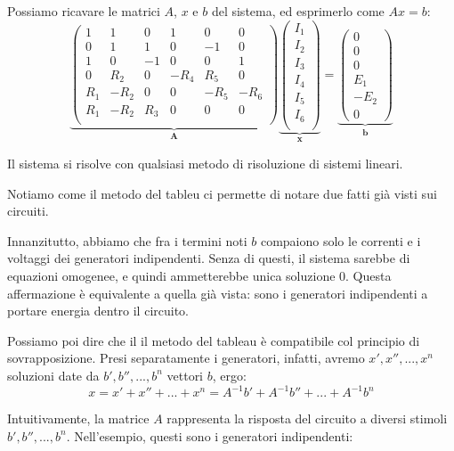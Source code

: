 \documentclass[a4paper,11pt]{article}
\begin{document}
Possiamo ricavare le matrici $A$, $x$ e $b$ del sistema, ed esprimerlo come $Ax = b$:
\[
\underbrace{\begin{pmatrix}
		1 & 1 & 0 & 1 & 0 & 0 \\ 
		0 & 1 & 1 & 0 & -1 & 0 \\ 
		1 & 0 & -1 & 0 & 0 & 1 \\ 
		0 & R_2 & 0 & -R_4 & R_5 & 0 \\ 
		R_1 & -R_2 & 0 & 0 & -R_5 & -R_6 \\ 
		R_1 & -R_2 & R_3 & 0 & 0 & 0 \\ 
\end{pmatrix}}_{\mathbf{A}} 
\underbrace{\begin{pmatrix}
		I_1 \\
		I_2 \\
		I_3 \\
		I_4 \\
		I_5 \\
		I_6 \\
\end{pmatrix}}_{\mathbf{x}} 
= 
\underbrace{\begin{pmatrix}
		0 \\ 
		0 \\ 
		0 \\ 
		E_1 \\ 
		-E_2 \\ 
		0
\end{pmatrix}}_{\mathbf{b}}
\]

Il sistema si risolve con qualsiasi metodo di risoluzione di sistemi lineari.

\par\smallskip

Notiamo come il metodo del tableu ci permette di notare due fatti già visti sui circuiti.

Innanzitutto, abbiamo che fra i termini noti $b$ compaiono solo le correnti e i voltaggi dei generatori indipendenti.
Senza di questi, il sistema sarebbe di equazioni omogenee, e quindi ammetterebbe unica soluzione $0$.
Questa affermazione è equivalente a quella già vista: sono i generatori indipendenti a portare energia dentro il circuito.

Possiamo poi dire che il il metodo del tableau è compatibile col principio di sovrapposizione.
Presi separatamente i generatori, infatti, avremo $x', x'', ..., x^n$ soluzioni date da $b', b'', ..., b^n$ vettori $b$, ergo:
$$ x = x' + x'' + ... + x^n = A^{-1} b' + A^{-1} b'' + ... + A^{-1} b^n$$

Intuitivamente, la matrice $A$ rappresenta la risposta del circuito a diversi stimoli $b', b'', ..., b^n$.
Nell'esempio, questi sono i generatori indipendenti:
\end{document}
